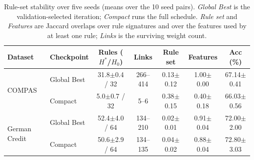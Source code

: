 \begin{table}[t]
\centering
\caption{Rule-set stability over five seeds (means over the 10 seed pairs). \emph{Global Best} is the validation-selected iteration; \emph{Compact} runs the full schedule. \emph{Rule set} and \emph{Features} are Jaccard overlaps over rule signatures and over the features used by at least one rule; \emph{Links} is the surviving weight count.}
\label{tab:seed_stability}
\setlength{\tabcolsep}{6pt}
\renewcommand{\arraystretch}{1.05}
\begin{tabular}{l l c c c c c}
\toprule
\textbf{Dataset} & \textbf{Checkpoint} & \textbf{Rules ($H^*$/$H_0$)} & \textbf{Links} & \textbf{Rule set} & \textbf{Features} & \textbf{Acc (\%)} \\
\midrule
\multirow{2}{*}{COMPAS} & Global Best & 31.8$\pm$0.4 / 32 & 266--414 & 0.13$\pm$0.12 & 1.00$\pm$0.00 & 67.14$\pm$0.41 \\
 & Compact & 5.0$\pm$0.7 / 32 & 5--6 & 0.38$\pm$0.15 & 0.40$\pm$0.18 & 66.03$\pm$0.56 \\
\multirow{2}{*}{German Credit} & Global Best & 52.4$\pm$4.0 / 64 & 134--210 & 0.02$\pm$0.01 & 0.91$\pm$0.04 & 72.00$\pm$2.00 \\
 & Compact & 50.6$\pm$2.9 / 64 & 134--135 & 0.04$\pm$0.02 & 0.88$\pm$0.04 & 72.80$\pm$3.03 \\
\bottomrule
\end{tabular}
\end{table}
